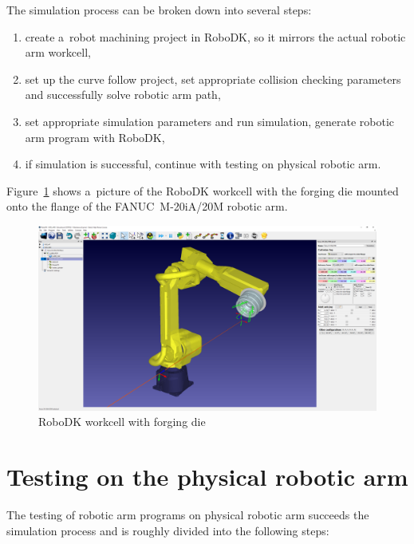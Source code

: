 The simulation process can be broken down into several steps:

\begin{enumerate}

\item create a~robot machining project in RoboDK, so it mirrors the actual robotic arm workcell, 

\item set up the curve follow project, set appropriate collision checking parameters and successfully solve robotic arm path,

\item set appropriate simulation parameters and run simulation,
generate robotic arm program with RoboDK,

\item if simulation is successful, continue with testing on physical robotic arm.

\end{enumerate}
Figure~\ref{fig:robodk_die} shows a~picture of the RoboDK workcell with the forging die mounted onto the flange of the FANUC~M-20iA/20M robotic arm.

\begin{figure}[h!]
    \centering
    \includegraphics[width=0.8\linewidth]{img/robodk_cast.PNG}
    \caption{RoboDK workcell with forging die}
    \label{fig:robodk_die}
\end{figure}


\section{Testing on the physical robotic arm}

The testing of robotic arm programs on physical robotic arm succeeds the simulation process and is roughly divided into the following steps:

